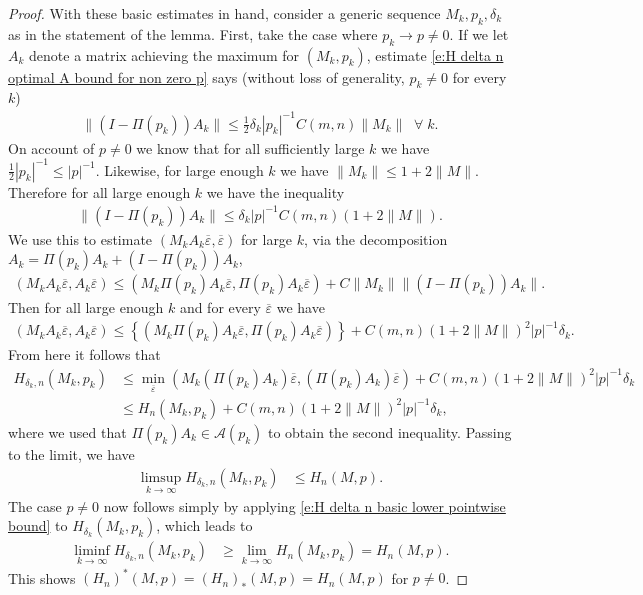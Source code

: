 \documentclass[reqno]{amsart}
\numberwithin{equation}{section}
\begin{document}
\begin{proof}
With these basic estimates in hand, consider a generic sequence $M_k,p_k,\delta_k$ as in the statement of the lemma. First, take the case where $p_k \to p \neq 0$. If we let $A_k$ denote a matrix achieving the maximum for $(M_k,p_k)$, estimate \eqref{e:H delta n optimal A bound for non zero p} says (without loss of generality, $p_k \neq 0$ for every $k$)
\begin{align*}
  \|(I-\Pi(p_k))A_k\|\leq \tfrac{1}{2}\delta_k |p_k|^{-1} C(m,n)\|M_k\|\;\;\forall\;k.
\end{align*}
On account of $p \neq 0$ we know that for all sufficiently large $k$ we have $\tfrac{1}{2}|p_k|^{-1}\leq |p|^{-1}$. Likewise, for large enough $k$ we have $\|M_k\|\leq 1+ 2\|M\|$. Therefore for all large enough $k$ we have the inequality
\begin{align*}
  \|(I-\Pi(p_k))A_k\| \leq \delta_k |p|^{-1}C(m,n)(1+ 2\|M\|).    
\end{align*}
We use this to estimate $(M_kA_k\overline \varepsilon,\overline \varepsilon)$ for large $k$, via the decomposition $A_k = \Pi(p_k)A_k+(I-\Pi(p_k))A_k$,  
\begin{align*}
  (M_kA_k\overline \varepsilon, A_k\overline \varepsilon) \leq (M_k\Pi(p_k)A_k \overline\varepsilon,\Pi(p_k)A_k \overline \varepsilon) + C\|M_k\|\|(I-\Pi(p_k))A_k\|. 
\end{align*}
Then for all large enough $k$ and for every $\overline \varepsilon$ we have
\begin{align*}
  (M_kA_k\overline \varepsilon, A_k\overline \varepsilon) \leq \left \{ (M_k\Pi(p_k)A_k \overline\varepsilon,\Pi(p_k)A_k \overline \varepsilon)\right \} + C(m,n)(1+2\|M\|)^2|p|^{-1}\delta_k. 
\end{align*}
 From here it follows that
\begin{align*}
   H_{\delta_k,n}(M_k,p_k) & \leq \min_{\overline\varepsilon}(M_k(\Pi(p_k)A_k)\overline\varepsilon, (\Pi(p_k)A_k)\overline \varepsilon) + C(m,n)(1+2\|M\|)^2|p|^{-1}\delta_k\\
   & \leq H_n(M_k,p_k) + C(m,n)(1+2\|M\|)^2|p|^{-1}\delta_k,
\end{align*}
where we used that $\Pi(p_k)A_k \in \mathcal{A}(p_k)$ to obtain the second inequality. Passing to the limit, we have
\begin{align*}
   \limsup_{k \to \infty} H_{\delta_k,n}(M_k,p_k) & \leq H_n(M,p).
\end{align*}
The case $p\neq 0$ now follows simply by applying \eqref{e:H delta n basic lower pointwise bound} to $H_{\delta_k}(M_k,p_k)$, which leads to 
\begin{align*}
   \liminf \limits_{k \to \infty} H_{\delta_k,n}(M_k,p_k) & \geq \lim \limits_{k\to \infty} H_n(M_k,p_k) = H_n(M,p).
\end{align*}
This shows $(H_n)^*(M,p) = (H_n)_*(M,p) = H_n(M,p)$ for $p\neq 0$.


\end{proof}
\end{document}
